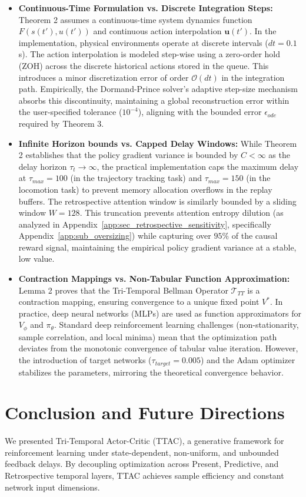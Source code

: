 \documentclass[manuscript, screen, review]{jair}
\begin{document}
\begin{itemize}
    \item \textbf{Continuous-Time Formulation vs. Discrete Integration Steps:}
    Theorem 2 assumes a continuous-time system dynamics function $F(s(t'), u(t'))$ and continuous action interpolation $\mathbf{u}(t')$. In the implementation, physical environments operate at discrete intervals ($dt = 0.1\,$s). The action interpolation is modeled step-wise using a zero-order hold (ZOH) across the discrete historical actions stored in the queue. This introduces a minor discretization error of order $\mathcal{O}(dt)$ in the integration path. Empirically, the Dormand-Prince solver's adaptive step-size mechanism absorbs this discontinuity, maintaining a global reconstruction error within the user-specified tolerance ($10^{-4}$), aligning with the bounded error $\epsilon_{ode}$ required by Theorem 3.
    \item \textbf{Infinite Horizon bounds vs. Capped Delay Windows:}
    While Theorem 2 establishes that the policy gradient variance is bounded by $C < \infty$ as the delay horizon $\tau_t \to \infty$, the practical implementation caps the maximum delay at $\tau_{max} = 100$ (in the trajectory tracking task) and $\tau_{max} = 150$ (in the locomotion task) to prevent memory allocation overflows in the replay buffers. The retrospective attention window is similarly bounded by a sliding window $W = 128$. This truncation prevents attention entropy dilution (as analyzed in Appendix~\ref{app:sec_retrospective_sensitivity}, specifically Appendix~\ref{app:sub_oversizing}) while capturing over $95\%$ of the causal reward signal, maintaining the empirical policy gradient variance at a stable, low value.
    \item \textbf{Contraction Mappings vs. Non-Tabular Function Approximation:}
    Lemma 2 proves that the Tri-Temporal Bellman Operator $\mathcal{T}_{TT}$ is a contraction mapping, ensuring convergence to a unique fixed point $V^*$. In practice, deep neural networks (MLPs) are used as function approximators for $V_\phi$ and $\pi_\theta$. Standard deep reinforcement learning challenges (non-stationarity, sample correlation, and local minima) mean that the optimization path deviates from the monotonic convergence of tabular value iteration. However, the introduction of target networks ($\tau_{target} = 0.005$) and the Adam optimizer stabilizes the parameters, mirroring the theoretical convergence behavior.
\end{itemize}

\section{Conclusion and Future Directions}
We presented Tri-Temporal Actor-Critic (TTAC), a generative framework for reinforcement learning under state-dependent, non-uniform, and unbounded feedback delays. By decoupling optimization across Present, Predictive, and Retrospective temporal layers, TTAC achieves sample efficiency and constant network input dimensions. 
\end{document}
